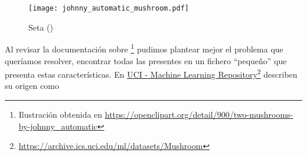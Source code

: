 \ABIERTO

\begin{wrapfigure}{o}{0.24\textwidth}
  \centering
  \texttt{[image: johnny\_automatic\_mushroom.pdf]}
	\caption{Seta (\mushroom)}
	\label{fig:Seta}
\end{wrapfigure}
Al revisar la documentación sobre \mushroom\footnote{Ilustración obtenida en \url{https://openclipart.org/detail/900/two-mushrooms-by-johnny_automatic}} pudimos plantear mejor el problema que queríamos resolver, encontrar todas las \ARs presentes en un fichero "`pequeño"' que presenta estas características. En \href{https://archive.ics.uci.edu/ml/datasets/Mushroom}{UCI - Machine Learning Repository}\footnote{\url{https://archive.ics.uci.edu/ml/datasets/Mushroom}} describen su origen como



